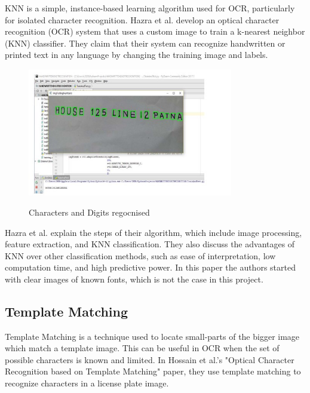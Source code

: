 KNN is a simple, instance-based learning algorithm used for OCR, particularly for isolated character recognition. Hazra et al. develop an optical character recognition (OCR) system that uses a custom image to train a k-nearest neighbor (KNN) classifier. They claim that their system can recognize handwritten or printed text in any language by changing the training image and labels. \cite{hazraOpticalCharacterRecognition2017}

\begin{figure}[!h]
    \centering
    \includegraphics[width=0.8\textwidth]{Figures/KNN_Hazra.jpg}
    \caption[Optical Character Recognition using KNN on Custom
        Image Dataset]{Characters and Digits regocnised}\cite{joshuaDevelopmentImageProcessing2023}
    \label{fig:Hazra OCR KNN Paper}
\end{figure}

Hazra et al. explain the steps of their algorithm, which include image processing, feature extraction, and KNN classification. They also discuss the advantages of KNN over other classification methods, such as ease of interpretation, low computation time, and high predictive power. In this paper the authors started with clear images of known fonts, which is not the case in this project.


\newpage

\subsection{Template Matching}

Template Matching is a technique used to locate small-parts of the bigger image which match a template image. This can be useful in OCR when the set of possible characters is known and limited. In Hossain et al.'s "Optical Character Recognition based on Template Matching" paper, they use template matching to recognize characters in a license plate image.

